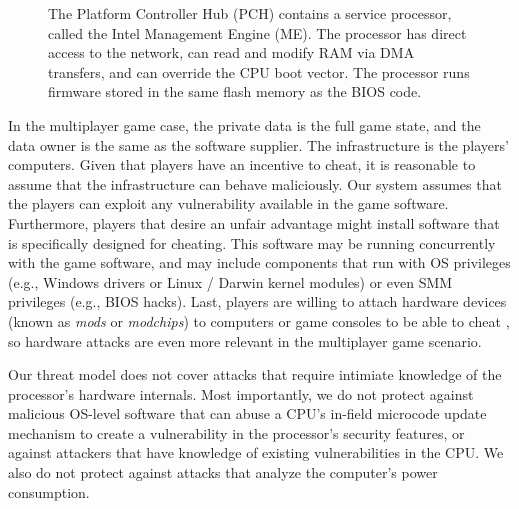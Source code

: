 \begin{figure}[hbtp]
  \caption{
    The Platform Controller Hub (PCH) contains a service processor, called the
    Intel Management Engine (ME). The processor has direct access to the
    network, can read and modify RAM via DMA transfers, and can override the
    CPU boot vector. The processor runs firmware stored in the same flash
    memory as the BIOS code.
  }
  \label{fig:pch}
\end{figure}

In the multiplayer game case, the private data is the full game state, and the
data owner is the same as the software supplier. The infrastructure is the
players' computers. Given that players have an incentive to cheat, it is
reasonable to assume that the infrastructure can behave maliciously. Our system
assumes that the players can exploit any vulnerability available in the game
software. Furthermore, players that desire an unfair advantage might install
software that is specifically designed for cheating. This software may be
running concurrently with the game software, and may include components that
run with OS privileges (e.g., Windows drivers or Linux / Darwin kernel
modules) or even SMM privileges (e.g., BIOS hacks). Last, players are willing
to attach hardware devices (known as \textit{mods} or \textit{modchips}) to
computers or game consoles to be able to cheat \cite{harris2007mod}, so
hardware attacks are even more relevant in the multiplayer game scenario.

Our threat model does not cover attacks that require intimiate knowledge of the
processor's hardware internals. Most importantly, we do not protect against
malicious OS-level software that can abuse a CPU's in-field microcode update
mechanism to create a vulnerability in the processor's security features, or
against attackers that have knowledge of existing vulnerabilities in the CPU.
We also do not protect against attacks that analyze the computer's power
consumption.

